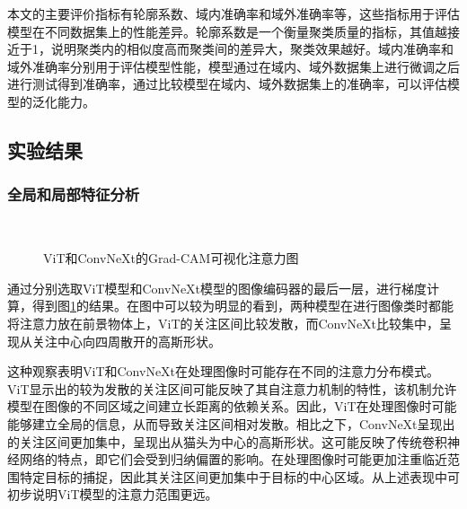 本文的主要评价指标有轮廓系数、域内准确率和域外准确率等，这些指标用于评估模型在不同数据集上的性能差异。轮廓系数是一个衡量聚类质量的指标，其值越接近于1，说明聚类内的相似度高而聚类间的差异大，聚类效果越好。域内准确率和域外准确率分别用于评估模型性能，模型通过在域内、域外数据集上进行微调之后进行测试得到准确率，通过比较模型在域内、域外数据集上的准确率，可以评估模型的泛化能力。

\subsection{实验结果}

\subsubsection{全局和局部特征分析}

\begin{figure}[H]
    \centering
    \\
     \caption{ViT和ConvNeXt的Grad-CAM可视化注意力图}
    \label{fig:grad}
\end{figure}

通过分别选取ViT模型和ConvNeXt模型的图像编码器的最后一层，进行梯度计算，得到图\ref{fig:grad}的结果。在图中可以较为明显的看到，两种模型在进行图像类时都能将注意力放在前景物体上，ViT的关注区间比较发散，而ConvNeXt比较集中，呈现从关注中心向四周散开的高斯形状。

这种观察表明ViT和ConvNeXt在处理图像时可能存在不同的注意力分布模式。ViT显示出的较为发散的关注区间可能反映了其自注意力机制的特性，该机制允许模型在图像的不同区域之间建立长距离的依赖关系。因此，ViT在处理图像时可能能够建立全局的信息，从而导致关注区间相对发散。相比之下，ConvNeXt呈现出的关注区间更加集中，呈现出从猫头为中心的高斯形状。这可能反映了传统卷积神经网络的特点，即它们会受到归纳偏置的影响。在处理图像时可能更加注重临近范围特定目标的捕捉，因此其关注区间更加集中于目标的中心区域。从上述表现中可初步说明ViT模型的注意力范围更远。

